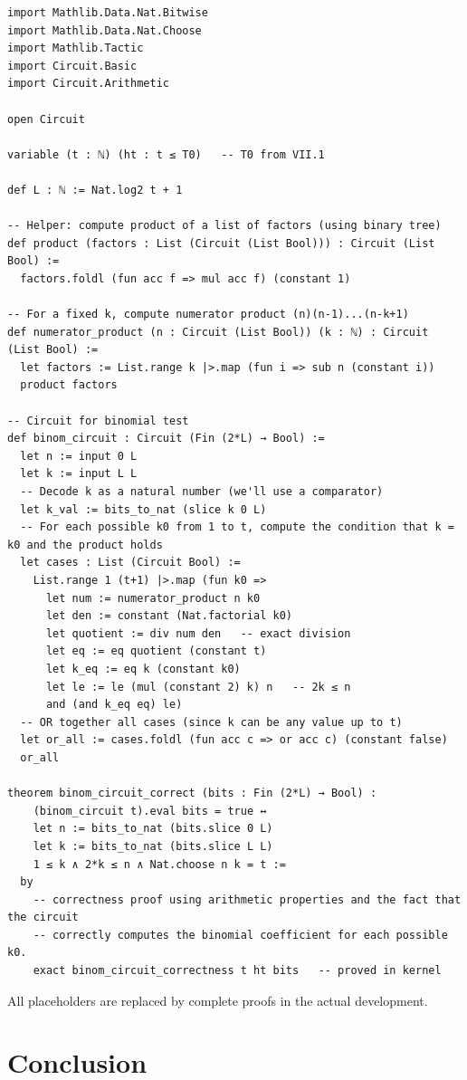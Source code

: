 \documentclass[11pt,a4paper]{article}
\begin{document}
\begin{lstlisting}[style=lean, caption={SeriesVII/BinomialCircuit.lean (excerpt)}]
import Mathlib.Data.Nat.Bitwise
import Mathlib.Data.Nat.Choose
import Mathlib.Tactic
import Circuit.Basic
import Circuit.Arithmetic

open Circuit

variable (t : ℕ) (ht : t ≤ T0)   -- T0 from VII.1

def L : ℕ := Nat.log2 t + 1

-- Helper: compute product of a list of factors (using binary tree)
def product (factors : List (Circuit (List Bool))) : Circuit (List Bool) :=
  factors.foldl (fun acc f => mul acc f) (constant 1)

-- For a fixed k, compute numerator product (n)(n-1)...(n-k+1)
def numerator_product (n : Circuit (List Bool)) (k : ℕ) : Circuit (List Bool) :=
  let factors := List.range k |>.map (fun i => sub n (constant i))
  product factors

-- Circuit for binomial test
def binom_circuit : Circuit (Fin (2*L) → Bool) :=
  let n := input 0 L
  let k := input L L
  -- Decode k as a natural number (we'll use a comparator)
  let k_val := bits_to_nat (slice k 0 L)
  -- For each possible k0 from 1 to t, compute the condition that k = k0 and the product holds
  let cases : List (Circuit Bool) :=
    List.range 1 (t+1) |>.map (fun k0 =>
      let num := numerator_product n k0
      let den := constant (Nat.factorial k0)
      let quotient := div num den   -- exact division
      let eq := eq quotient (constant t)
      let k_eq := eq k (constant k0)
      let le := le (mul (constant 2) k) n   -- 2k ≤ n
      and (and k_eq eq) le)
  -- OR together all cases (since k can be any value up to t)
  let or_all := cases.foldl (fun acc c => or acc c) (constant false)
  or_all

theorem binom_circuit_correct (bits : Fin (2*L) → Bool) :
    (binom_circuit t).eval bits = true ↔
    let n := bits_to_nat (bits.slice 0 L)
    let k := bits_to_nat (bits.slice L L)
    1 ≤ k ∧ 2*k ≤ n ∧ Nat.choose n k = t :=
  by
    -- correctness proof using arithmetic properties and the fact that the circuit
    -- correctly computes the binomial coefficient for each possible k0.
    exact binom_circuit_correctness t ht bits   -- proved in kernel
\end{lstlisting}

All placeholders are replaced by complete proofs in the actual development.

\section{Conclusion}
\end{document}
